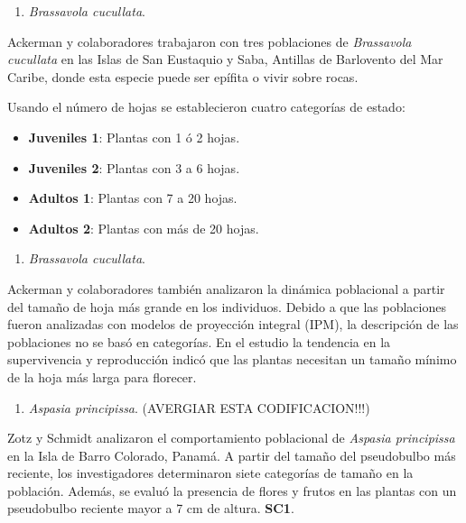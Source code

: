 \documentclass[
]{book}
\providecommand{\tightlist}{%
  \setlength{\itemsep}{0pt}\setlength{\parskip}{0pt}}
\theoremstyle{definition}
\theoremstyle{definition}
\theoremstyle{definition}
\theoremstyle{definition}
\theoremstyle{remark}
\begin{document}
\begin{enumerate}
\def\labelenumi{\alph{enumi})}
\setcounter{enumi}{5}
\tightlist
\item
  \emph{Brassavola cucullata}.
\end{enumerate}

Ackerman y colaboradores \citep{ackerman2020small} trabajaron con tres poblaciones de \emph{Brassavola cucullata} en las Islas de San Eustaquio y Saba, Antillas de Barlovento del Mar Caribe, donde esta especie puede ser epífita o vivir sobre rocas.

Usando el número de hojas se establecieron cuatro categorías de estado:

\begin{itemize}
\tightlist
\item
  \textbf{Juveniles 1}: Plantas con 1 ó 2 hojas.
\item
  \textbf{Juveniles 2}: Plantas con 3 a 6 hojas.
\item
  \textbf{Adultos 1}: Plantas con 7 a 20 hojas.
\item
  \textbf{Adultos 2}: Plantas con más de 20 hojas.
\end{itemize}

\begin{enumerate}
\def\labelenumi{\alph{enumi})}
\setcounter{enumi}{6}
\tightlist
\item
  \emph{Brassavola cucullata}.
\end{enumerate}

Ackerman y colaboradores \citep{ackerman2020small} también analizaron la dinámica poblacional a partir del tamaño de hoja más grande en los individuos. Debido a que las poblaciones fueron analizadas con modelos de proyección integral (IPM), la descripción de las poblaciones no se basó en categorías. En el estudio la tendencia en la supervivencia y reproducción indicó que las plantas necesitan un tamaño mínimo de la hoja más larga para florecer.

\begin{enumerate}
\def\labelenumi{\alph{enumi})}
\setcounter{enumi}{7}
\tightlist
\item
  \emph{Aspasia principissa}.
  (AVERGIAR ESTA CODIFICACION!!!)
\end{enumerate}

Zotz y Schmidt \citep{zotz2006population} analizaron el comportamiento poblacional de \emph{Aspasia principissa} en la Isla de Barro Colorado, Panamá. A partir del tamaño del pseudobulbo más reciente, los investigadores determinaron siete categorías de tamaño en la población. Además, se evaluó la presencia de flores y frutos en las plantas con un pseudobulbo reciente mayor a 7 cm de altura.
\textbf{SC1}.
\end{document}
